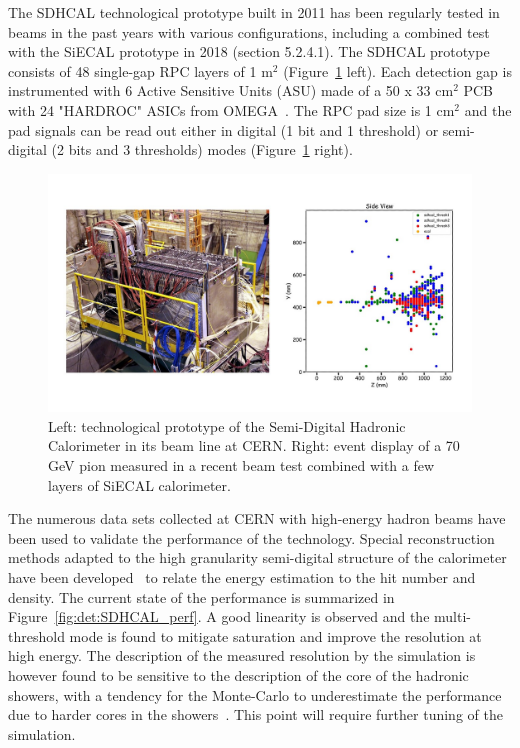 The SDHCAL technological prototype built in 2011 has been regularly tested in beams in the past years with various configurations, including a combined test with the SiECAL prototype in 2018 (section 5.2.4.1). The SDHCAL prototype consists of 48 single-gap RPC layers of 1 m$^2$ (Figure~\ref{fig:det:SDHCAL_proto} left). Each detection gap is instrumented with 6 Active Sensitive Units (ASU) made of a  50 x 33 cm$^2$ PCB with 24 "HARDROC" ASICs from OMEGA~\cite{Callier:2014uqa}. The RPC pad size is 1 cm$^2$ and the pad signals can be read out either in digital (1 bit and 1 threshold) or semi-digital (2 bits and 3 thresholds) modes (Figure~\ref{fig:det:SDHCAL_proto} right).

\begin{figure}[t!]
\centering
\includegraphics[width=1.0\hsize]{Detector/fig/SDHCAL_proto.jpg}
\caption{Left: technological prototype of the Semi-Digital Hadronic Calorimeter in its beam line at CERN. Right: event display of a 70 GeV pion measured in a recent beam test combined with a few layers of SiECAL calorimeter.}
\label{fig:det:SDHCAL_proto}
\end{figure}

The numerous data sets collected at CERN with high-energy hadron beams have been used to validate the performance of the technology. Special reconstruction methods adapted to the high granularity semi-digital structure of the calorimeter have been developed~\cite{Buridon:2016ill} to relate the energy estimation to the hit number and density. The current state of the performance is summarized in Figure~\ref{fig:det:SDHCAL_perf}. A good linearity is observed and the multi-threshold mode is found to mitigate saturation and improve the resolution at high energy. The description of the measured resolution by the simulation is however found to be sensitive to the description of the core of the hadronic showers, with a tendency for the Monte-Carlo to underestimate the performance due to harder cores in the showers~\cite{Deng:2016obt}. This point will require further tuning of the simulation.

